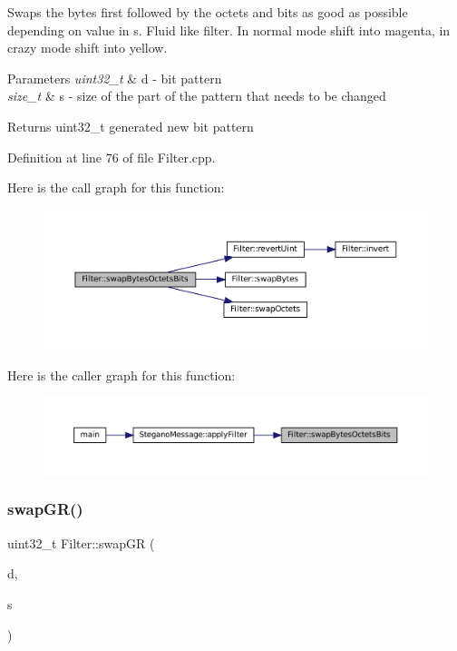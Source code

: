 Swaps the bytes first followed by the octets and bits as good as possible depending on value in s. Fluid like filter. In normal mode shift into magenta, in crazy mode shift into yellow. 


\begin{DoxyParams}{Parameters}
{\em uint32\+\_\+t} & d -\/ bit pattern \\
\hline
{\em size\+\_\+t} & s -\/ size of the part of the pattern that needs to be changed \\
\hline
\end{DoxyParams}
\begin{DoxyReturn}{Returns}
uint32\+\_\+t generated new bit pattern 
\end{DoxyReturn}


Definition at line 76 of file Filter.\+cpp.

Here is the call graph for this function\+:\nopagebreak
\begin{figure}[H]
\begin{center}
\leavevmode
\includegraphics[width=350pt]{classFilter_a9c8e2eb790e7e9dff6493a12a1fefc4f_cgraph}
\end{center}
\end{figure}
Here is the caller graph for this function\+:\nopagebreak
\begin{figure}[H]
\begin{center}
\leavevmode
\includegraphics[width=350pt]{classFilter_a9c8e2eb790e7e9dff6493a12a1fefc4f_icgraph}
\end{center}
\end{figure}
\mbox{\label{classFilter_ad6f109289f21be75db0a1351c86d3143}} 
\subsubsection{\texorpdfstring{swapGR()}{swapGR()}}
{\footnotesize\ttfamily uint32\+\_\+t Filter\+::swap\+GR (\begin{DoxyParamCaption}\item[{uint32\+\_\+t}]{d,  }\item[{size\+\_\+t}]{s }\end{DoxyParamCaption})\hspace{0.3cm}{\ttfamily [static]}}



